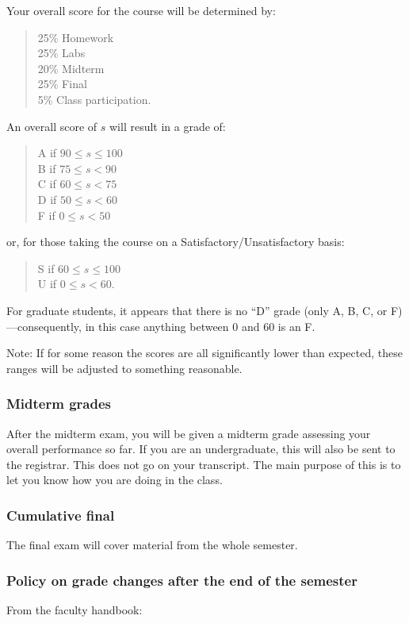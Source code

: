 \documentclass[12pt]{article}
\begin{document}
Your overall score for the course will be determined by:
\begin{quote}
25\% Homework \\
25\% Labs \\
20\% Midterm \\
25\% Final \\
5\% Class participation.
\end{quote}
An overall score of $s$ will result in a grade of:
\begin{quote}
A if $90\leq s\leq 100$ \\
B if $75\leq s < 90$ \\
C if $60\leq s < 75$ \\
D if $50\leq s < 60$ \\
F if $0\leq s < 50$
\end{quote}
or, for those taking the course on a Satisfactory/Unsatisfactory basis:
\begin{quote}
S if $60\leq s\leq 100$ \\
U if $0\leq s < 60$.
\end{quote}
For graduate students, it appears that there is no ``D'' grade (only A, B, C, or F)---consequently, in this case anything between $0$ and $60$ is an F. 

Note: If for some reason the scores are all significantly lower than expected, these ranges will be adjusted to something reasonable.

\subsubsection*{Midterm grades}
After the midterm exam, you will be given a midterm grade assessing your overall performance so far. If you are an undergraduate, this will also be sent to the registrar. This does not go on your transcript. The main purpose of this is to let you know how you are doing in the class.

\subsubsection*{Cumulative final}
The final exam will cover material from the whole semester.

\subsubsection*{Policy on grade changes after the end of the semester}
From the faculty handbook:
\end{document}
